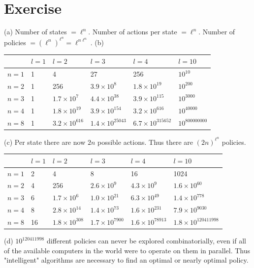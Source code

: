 \documentclass[10pt]{book}
\begin{document}
\section{Exercise}
(a) Number of states $=\ell^{n}$. Number of actions per state $=\ell^{n}$. Number of policies $=\left(\ell^{n}\right)^{\ell^{n}}=\ell^{n \ell^{n}}$.
(b)
\begin{tabular}{|l|l|l|l|l|l|}
\hline & $l=1$ & $l=2$ & $l=3$ & $l=4$ & $l=10$ \\
\hline $n=1$ & 1 & 4 & 27 & 256 & $10^{10}$ \\
\hline $n=2$ & 1 & 256 & $3.9 \times 10^{8}$ & $1.8 \times 10^{19}$ & $10^{200}$ \\
\hline $n=3$ & 1 & $1.7 \times 10^{7}$ & $4.4 \times 10^{38}$ & $3.9 \times 10^{115}$ & $10^{3000}$ \\
\hline $n=4$ & 1 & $1.8 \times 10^{19}$ & $3.9 \times 10^{154}$ & $3.2 \times 10^{616}$ & $10^{40000}$ \\
\hline $n=8$ & 1 & $3.2 \times 10^{616}$ & $1.4 \times 10^{25043}$ & $6.7 \times 10^{315652}$ & $10^{800000000}$ \\
\hline
\end{tabular}
(c) Per state there are now $2 n$ possible actions. Thus there are $(2 n)^{\ell^{n}}$ policies.
\begin{tabular}{|l|l|l|l|l|l|}
\hline & $l=1$ & $l=2$ & $l=3$ & $l=4$ & $l=10$ \\
\hline $n=1$ & 2 & 4 & 8 & 16 & 1024 \\
\hline $n=2$ & 4 & 256 & $2.6 \times 10^{9}$ & $4.3 \times 10^{9}$ & $1.6 \times 10^{60}$ \\
\hline $n=3$ & 6 & $1.7 \times 10^{6}$ & $1.0 \times 10^{21}$ & $6.3 \times 10^{49}$ & $1.4 \times 10^{778}$ \\
\hline $n=4$ & 8 & $2.8 \times 10^{14}$ & $1.4 \times 10^{73}$ & $1.6 \times 10^{231}$ & $7.9 \times 10^{9030}$ \\
\hline $n=8$ & 16 & $1.8 \times 10^{308}$ & $1.7 \times 10^{7900}$ & $1.6 \times 10^{78913}$ & $1.8 \times 10^{120411998}$ \\
\hline
\end{tabular}
(d) $10^{120411998}$ different policies can never be explored combinatorially, even if all of the available computers in the world were to operate on them in parallel. Thus "intelligent" algorithms are necessary to find an optimal or nearly optimal policy.
\end{document}
